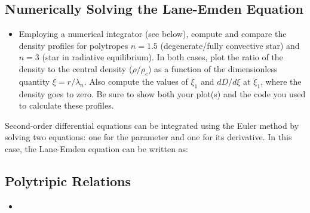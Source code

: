 \documentclass{article}
\begin{document}
\begin{center}
\section*{Numerically Solving the Lane-Emden Equation}
\end{center}

\begin{itemize}
\item Employing a numerical integrator (see below), compute and compare the density profiles for polytropes $n = 1.5$ (degenerate/fully convective star) and $n = 3$ (star in radiative equilibrium). In both cases, plot the ratio of the density to the central density ($\rho / \rho_c$) as a function of the dimensionless quantity $\xi = r / \lambda_n$. Also compute the values of $\xi_1$ and $dD / d\xi$ at $\xi_1$, where the density goes to zero. Be sure to show both your plot(s) and the code you used to calculate these profiles.
\end{itemize}

Second-order differential equations can be integrated using the Euler method by solving two equations: one for the parameter and one for its derivative. In this case, the Lane-Emden equation can be written as:\\



\begin{center}
\section*{Polytripic Relations}
\end{center}

\begin{itemize}
\item 
\end{itemize}
\end{document}
